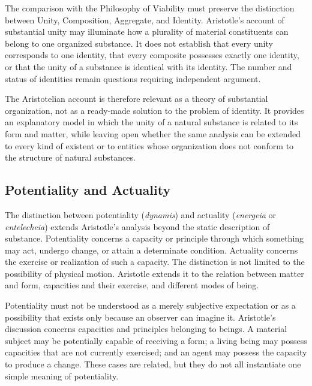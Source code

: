 \label{para:VS.B01.P01.C08.S05.SS06.P004}

The comparison with the Philosophy of Viability
must preserve the distinction between Unity,
Composition, Aggregate, and Identity. Aristotle's
account of substantial unity may illuminate how
a plurality of material constituents can belong
to one organized substance. It does not establish
that every unity corresponds to one identity, that
every composite possesses exactly one identity,
or that the unity of a substance is identical with
its identity. The number and status of identities
remain questions requiring independent argument.

\label{para:VS.B01.P01.C08.S05.SS06.P005}

The Aristotelian account is therefore relevant
as a theory of substantial organization, not as
a ready-made solution to the problem of identity.
It provides an explanatory model in which the
unity of a natural substance is related to its
form and matter, while leaving open whether
the same analysis can be extended to every
kind of existent or to entities whose organization
does not conform to the structure of natural
substances.


\subsection{Potentiality and Actuality}

\label{para:VS.B01.P01.C08.S05.SS07.P001}

The distinction between potentiality (\textit{dynamis})
and actuality (\textit{energeia} or \textit{entelecheia})
extends Aristotle's analysis beyond the static
description of substance. Potentiality concerns
a capacity or principle through which something
may act, undergo change, or attain a determinate
condition. Actuality concerns the exercise or
realization of such a capacity. The distinction
is not limited to the possibility of physical
motion. Aristotle extends it to the relation
between matter and form, capacities and their
exercise, and different modes of being. \cite{AristotleMetaphysics}

\label{para:VS.B01.P01.C08.S05.SS07.P002}

Potentiality must not be understood as a merely
subjective expectation or as a possibility that
exists only because an observer can imagine it.
Aristotle's discussion concerns capacities and
principles belonging to beings. A material subject
may be potentially capable of receiving a form;
a living being may possess capacities that are
not currently exercised; and an agent may possess
the capacity to produce a change. These cases
are related, but they do not all instantiate
one simple meaning of potentiality.

